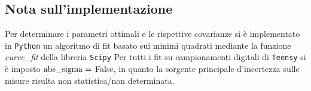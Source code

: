 \documentclass{article}[a4paper, oneside, 11pt]
\begin{document}
\subsection{Nota sull'implementazione}
Per determinare i parametri ottimali e le rispettive covarianze si \`e
implementato in \verb+Python+ un algoritmo di fit basato sui minimi quadrati
mediante la funzione \emph{curve\_fit} della libreria \texttt{Scipy}\cite{scipy}
Per tutti i fit su campionamenti digitali di \verb+Teensy+ si \`e imposto
$\rm{abs\_sigma} =$ False, in quanto la sorgente principale d'incertezza
sulle misure risulta non statistica/non determinata.

\medskip


\end{document}
